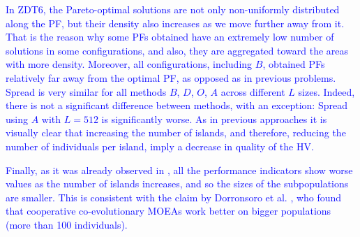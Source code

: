 \documentclass[preprint]{elsarticle}
\begin{document}
\textcolor{blue}{In ZDT6, the Pareto-optimal solutions are not only non-uniformly distributed along the PF, but their density also increases as we move further away from it. That is the reason why some PFs obtained have an extremely low number of solutions in some configurations, and also, they are aggregated toward the areas with more density. Moreover, all configurations, including $B$, obtained PFs relatively far away from the optimal PF, as opposed as in previous problems. Spread is very similar for all methods $B$, $D$, $O$, $A$ across different $L$ sizes. Indeed, there is not a significant difference between methods, with an exception: Spread using $A$ with $L=512$ is significantly worse. As in previous approaches it is visually clear that increasing the number of islands, and therefore, reducing the number of individuals per island, imply a decrease in quality of the HV.}

\textcolor{blue}{Finally, as it was already observed in \citep{Garcia16hpmoon}, all the performance indicators show worse values as the number of islands increases, and so the  sizes of the subpopulations are smaller. This is consistent with the claim by Dorronsoro et al. \citep{Dorronsoro13superlinear}, who found that cooperative co-evolutionary MOEAs work better on bigger populations (more than 100 individuals).}



\end{document}
